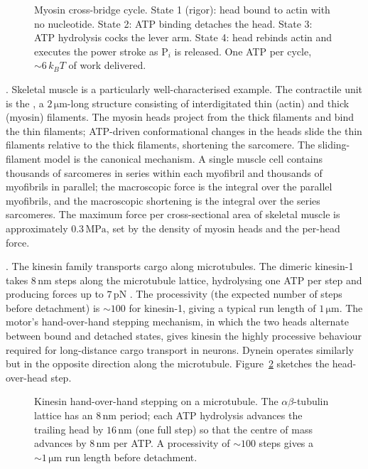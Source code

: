 \begin{figure}[ht]
\centering

\caption{Myosin cross-bridge cycle. State 1 (rigor): head bound to
actin with no nucleotide. State 2: ATP binding detaches the head.
State 3: ATP hydrolysis cocks the lever arm. State 4: head rebinds
actin and executes the power stroke as P$_i$ is released. One ATP
per cycle, $\sim 6\,k_B T$ of work delivered.}
\label{fig:v6c04-myosin}
\end{figure}

. Skeletal muscle is a particularly
well-characterised example. The contractile unit is the
, a $2\,\si{\micro\meter}$-long structure
consisting of interdigitated thin (actin) and thick (myosin)
filaments. The myosin heads project from the thick filaments and bind
the thin filaments; ATP-driven conformational changes in the heads
slide the thin filaments relative to the thick filaments, shortening
the sarcomere. The sliding-filament model
\cite{paper:v6c04-huxley-niedergerke-1954,paper:v6c04-huxley-hanson-1954}
is the canonical mechanism. A single muscle cell contains thousands
of sarcomeres in series within each myofibril and thousands of
myofibrils in parallel; the macroscopic force is the integral over
the parallel myofibrils, and the macroscopic shortening is the
integral over the series sarcomeres. The maximum force per
cross-sectional area of skeletal muscle is approximately
$0.3\,\text{MPa}$, set by the density of myosin heads and the
per-head force.

. The kinesin family transports cargo
along microtubules. The dimeric kinesin-1 takes $8\,\text{nm}$ steps
along the microtubule lattice, hydrolysing one ATP per step and
producing forces up to $7\,\text{pN}$
\cite{paper:v6c04-svoboda-block-1993}. The processivity (the
expected number of steps before detachment) is $\sim 100$ for
kinesin-1, giving a typical run length of $1\,\si{\micro\meter}$.
The motor's hand-over-hand stepping mechanism, in which the two
heads alternate between bound and detached states, gives kinesin
the highly processive behaviour required for long-distance cargo
transport in neurons. Dynein operates similarly but in the opposite
direction along the microtubule. Figure~\ref{fig:v6c04-kinesin}
sketches the head-over-head step.

\begin{figure}[ht]
\centering

\caption{Kinesin hand-over-hand stepping on a microtubule. The
$\alpha\beta$-tubulin lattice has an $8\,\text{nm}$ period; each ATP
hydrolysis advances the trailing head by $16\,\text{nm}$ (one full
step) so that the centre of mass advances by $8\,\text{nm}$ per ATP.
A processivity of $\sim 100$ steps gives a $\sim 1\,\si{\micro\meter}$
run length before detachment.}
\label{fig:v6c04-kinesin}
\end{figure}

